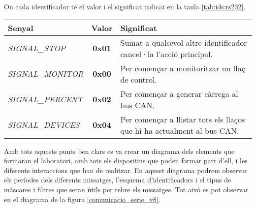 On cada identificador té el valor i el significat indicat en la taula \ref{tab:ids:rs232}.
\begin{center}
	\begin{tabularx}{\linewidth}{l | c | X}
		\textbf{Senyal}	& \textbf{Valor}	& \textbf{Significat}\\
		\hline
		\textit{SIGNAL\_STOP}	&\textbf{0x01}	& Sumat a qualsevol altre identificador cancel·la l'acció principal.\\
		\hline
		\textit{SIGNAL\_MONITOR}	& \textbf{0x00}	& Per començar a monitoritzar un llaç de control.\\
		\hline
		\textit{SIGNAL\_PERCENT}	& \textbf{0x02}	& Per començar a generar càrrega al bus CAN.\\
		\hline
		\textit{SIGNAL\_DEVICES}	& \textbf{0x04}	& Per començar a llistar tots els llaços que hi ha actualment al bus CAN.\\
		\hline
	\end{tabularx}
	\label{tab:ids:rs232}
\end{center}


Amb tots aquests punts ben clars es va crear un diagrama dels elements que formaran el laboratori, amb tots els dispositius que poden formar part d'ell, i les diferents interaccions que han de realitzar. En aquest diagrama podrem observar els períodes dels diferents missatges, l'esquema d'identificadors i el tipus de màscares i filtres que seran útils per rebre els missatges. Tot això es pot observar en el diagrama de la figura \ref{comunicacio_serie_v8}.

\begin{landscape}
\end{landscape}



